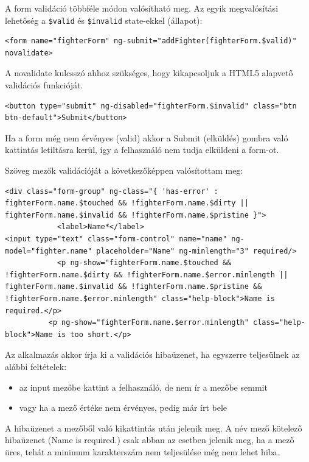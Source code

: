 
A form validáció többféle módon valósítható meg.
Az egyik megvalósítási lehetőség a \texttt{\$valid} és \texttt{\$invalid} state-ekkel (állapot):

\begin{verbatim}
<form name="fighterForm" ng-submit="addFighter(fighterForm.$valid)" novalidate>
\end{verbatim}

A novalidate kulcsszó ahhoz szükséges, hogy kikapcsoljuk a HTML5 alapvető validációs funkcióját.

\begin{verbatim}
<button type="submit" ng-disabled="fighterForm.$invalid" class="btn btn-default">Submit</button>
\end{verbatim}

Ha a form még nem érvényes (valid) akkor a Submit (elküldés) gombra való kattintás letiltásra kerül, így a felhasználó nem tudja elküldeni a form-ot.

Szöveg mezők validációját a következőképpen valósítottam meg:

\begin{verbatim}
<div class="form-group" ng-class="{ 'has-error' : fighterForm.name.$touched && !fighterForm.name.$dirty || fighterForm.name.$invalid && !fighterForm.name.$pristine }">
          	<label>Name*</label>
<input type="text" class="form-control" name="name" ng-model="fighter.name" placeholder="Name" ng-minlength="3" required/>
            <p ng-show="fighterForm.name.$touched && !fighterForm.name.$dirty && !fighterForm.name.$error.minlength || fighterForm.name.$invalid && !fighterForm.name.$pristine && !fighterForm.name.$error.minlength" class="help-block">Name is required.</p>
          <p ng-show="fighterForm.name.$error.minlength" class="help-block">Name is too short.</p>
\end{verbatim}

Az alkalmazás akkor írja ki a validációs hibaüzenet, ha egyszerre teljesülnek az alábbi feltételek:
\begin{itemize}
\item az input mezőbe kattint a felhasználó, de nem ír a mezőbe semmit 
\item vagy ha a mező értéke nem érvényes, pedig már írt bele
\end{itemize}

A hibaüzenet a mezőből való kikattintás után jelenik meg. A név mező kötelező hibaüzenet (Name is required.) csak abban az esetben jelenik meg, ha a mező üres, tehát a minimum karakterszám nem teljesülése még nem lehet hiba.

